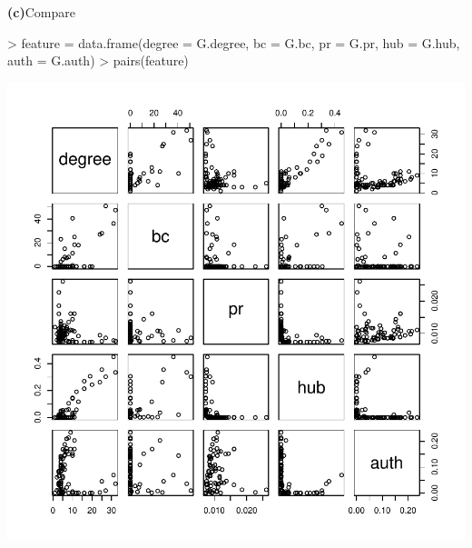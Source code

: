 \documentclass[a4paper]{article}
\renewcommand{\part}[1] {\vspace{.10in} {\bf (#1)}}
\begin{document}
\part{c}{Compare}
\begin{Schunk}
\begin{Sinput}
> feature = data.frame(degree = G.degree, bc = G.bc, pr = G.pr, hub = G.hub, auth = G.auth)
> pairs(feature)
\end{Sinput}
\end{Schunk}
\includegraphics{graph-1c}

\end{document}
